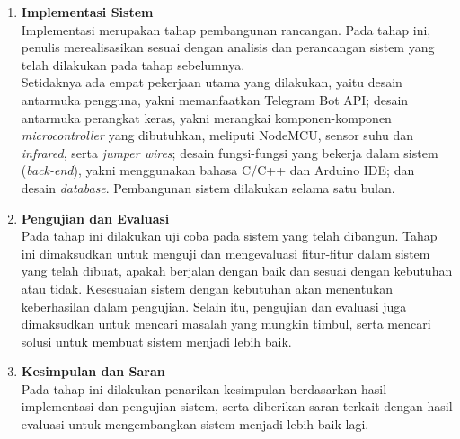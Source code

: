 \begin{enumerate}
	\item \textbf{Implementasi Sistem}\\
	\tab Implementasi merupakan tahap pembangunan rancangan. Pada tahap ini, penulis merealisasikan sesuai dengan analisis dan perancangan sistem yang telah dilakukan pada tahap sebelumnya.\\
	\tab Setidaknya ada empat pekerjaan utama yang dilakukan, yaitu desain antarmuka pengguna, yakni memanfaatkan Telegram Bot API; desain antarmuka perangkat keras, yakni merangkai komponen-komponen \textit{microcontroller} yang dibutuhkan, meliputi NodeMCU, sensor suhu dan \textit{infrared}, serta \textit{jumper wires}; desain fungsi-fungsi yang bekerja dalam sistem (\textit{back-end}), yakni menggunakan bahasa C/C++ dan Arduino IDE; dan desain \textit{database}. Pembangunan sistem dilakukan selama satu bulan.\\ 
	
	\item \textbf{Pengujian dan Evaluasi}\\
	\tab Pada tahap ini dilakukan uji coba pada sistem yang telah dibangun. Tahap ini dimaksudkan untuk menguji dan mengevaluasi fitur-fitur dalam sistem yang telah dibuat, apakah berjalan dengan baik dan sesuai dengan kebutuhan atau tidak. Kesesuaian sistem dengan kebutuhan akan menentukan keberhasilan dalam pengujian. Selain itu, pengujian dan evaluasi juga dimaksudkan untuk mencari masalah yang mungkin timbul, serta mencari solusi untuk membuat sistem menjadi lebih baik.\\
	
	\item \textbf{Kesimpulan dan Saran}\\
	\tab Pada tahap ini dilakukan penarikan kesimpulan berdasarkan hasil implementasi dan pengujian sistem, serta diberikan saran terkait dengan hasil evaluasi untuk mengembangkan sistem menjadi lebih baik lagi.
\end{enumerate}

